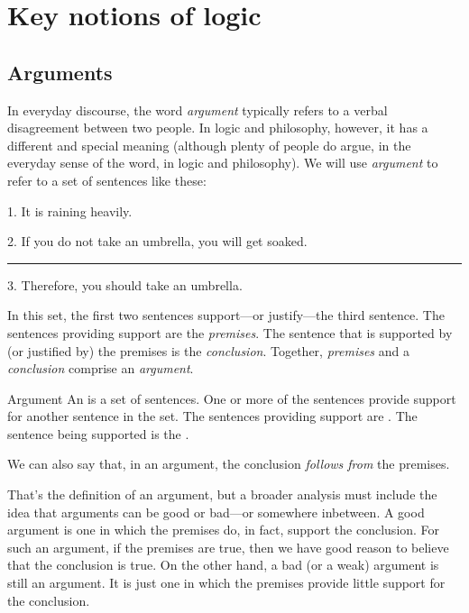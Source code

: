 \part{Key notions of logic}
\label{ch.intro}


\chapter{Arguments}
\label{s:Arguments}

In everyday discourse, the word \textit{argument} typically refers to a verbal disagreement between two people. In logic and philosophy, however, it has a different and special meaning (although plenty of people do argue, in the everyday sense of the word, in logic and philosophy). We will use \textit{argument} to refer to a set of sentences like these:
	\begin{earg}\label{argRaining}
		\item[1.] It is raining heavily.
		\item[2.] If you do not take an umbrella, you will get soaked.
		      \vspace{0.1cm}
     			\hrule
      			\vspace{0.12cm}
		\item[3.] Therefore, you should take an umbrella.
	\end{earg}
In this set, the first two sentences support---or justify---the third sentence. The sentences providing support are the \emph{premises}. The sentence that is supported by (or justified by) the premises is the \emph{conclusion}. Together, \textit{premises} and a \textit{conclusion} comprise an \textit{argument}.  

\begin{factboxy}{Argument}
An  is a set of sentences. One or more of the sentences provide support for another sentence in the set. The sentences providing support are . The sentence being supported is the .
\smallskip

We can also say that, in an argument, the conclusion \textit{follows from} the premises.
\end{factboxy}

That's the definition of an argument, but a broader analysis must include the idea that arguments can be good or bad---or  somewhere inbetween. A good argument is one in which the premises do, in fact, support the conclusion. For such an argument, if the premises are true, then we have good reason to believe that the conclusion is true. On the other hand, a bad (or a weak) argument is still an argument. It is just one in which the premises provide little support for the conclusion.

